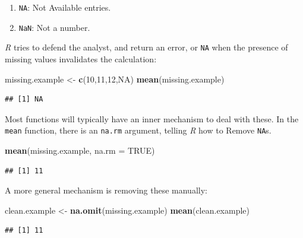 \documentclass[]{book}
\newenvironment{Shaded}{\begin{snugshade}}{\end{snugshade}}
\newcommand{\KeywordTok}[1]{\textcolor[rgb]{0.13,0.29,0.53}{\textbf{#1}}}
\newcommand{\DataTypeTok}[1]{\textcolor[rgb]{0.13,0.29,0.53}{#1}}
\newcommand{\DecValTok}[1]{\textcolor[rgb]{0.00,0.00,0.81}{#1}}
\newcommand{\StringTok}[1]{\textcolor[rgb]{0.31,0.60,0.02}{#1}}
\newcommand{\OtherTok}[1]{\textcolor[rgb]{0.56,0.35,0.01}{#1}}
\newcommand{\NormalTok}[1]{#1}
\providecommand{\tightlist}{%
  \setlength{\itemsep}{0pt}\setlength{\parskip}{0pt}}
\theoremstyle{definition}
\theoremstyle{definition}
\theoremstyle{definition}
\theoremstyle{remark}
\begin{document}
\begin{enumerate}
\def\labelenumi{\arabic{enumi}.}
\tightlist
\item
  \texttt{NA}: Not Available entries.
\item
  \texttt{NaN}: Not a number.
\end{enumerate}

\emph{R} tries to defend the analyst, and return an error, or
\texttt{NA} when the presence of missing values invalidates the
calculation:

\begin{Shaded}
\begin{Highlighting}[]
\NormalTok{missing.example <-}\StringTok{ }\KeywordTok{c}\NormalTok{(}\DecValTok{10}\NormalTok{,}\DecValTok{11}\NormalTok{,}\DecValTok{12}\NormalTok{,}\OtherTok{NA}\NormalTok{)}
\KeywordTok{mean}\NormalTok{(missing.example)}
\end{Highlighting}
\end{Shaded}

\begin{verbatim}
## [1] NA
\end{verbatim}

Most functions will typically have an inner mechanism to deal with
these. In the \texttt{mean} function, there is an \texttt{na.rm}
argument, telling \emph{R} how to Remove \texttt{NA}s.

\begin{Shaded}
\begin{Highlighting}[]
\KeywordTok{mean}\NormalTok{(missing.example, }\DataTypeTok{na.rm =} \OtherTok{TRUE}\NormalTok{)}
\end{Highlighting}
\end{Shaded}

\begin{verbatim}
## [1] 11
\end{verbatim}

A more general mechanism is removing these manually:

\begin{Shaded}
\begin{Highlighting}[]
\NormalTok{clean.example <-}\StringTok{ }\KeywordTok{na.omit}\NormalTok{(missing.example)}
\KeywordTok{mean}\NormalTok{(clean.example)}
\end{Highlighting}
\end{Shaded}

\begin{verbatim}
## [1] 11
\end{verbatim}
\end{document}
